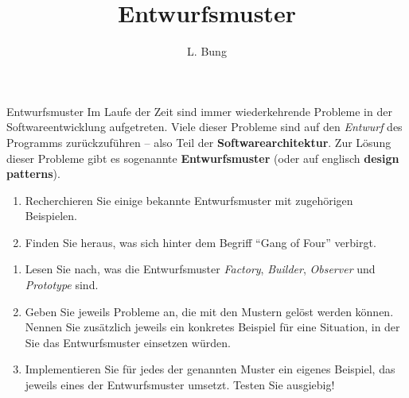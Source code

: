 \documentclass[11pt, a4paper, oneside]{article}
\begin{document}
	\author{L. Bung}
	\title{Entwurfsmuster}
	\subject{SAE}
	\maketitle
	
	\begin{hint}{Entwurfsmuster}
		Im Laufe der Zeit sind immer wiederkehrende Probleme in der Softwareentwicklung aufgetreten.
		Viele dieser Probleme sind auf den \emph{Entwurf} des Programms zurückzuführen -- also Teil der \textbf{Softwarearchitektur}.
		Zur Lösung dieser Probleme gibt es sogenannte \textbf{Entwurfsmuster} (oder auf englisch \textbf{design patterns}).
	\end{hint}
	
	
	\begin{enumerate}[label=\alph*)]
		\item Recherchieren Sie einige bekannte Entwurfsmuster mit zugehörigen Beispielen.
		
		\boxarea[9cm]
		
		\item Finden Sie heraus, was sich hinter dem Begriff ``Gang of Four'' verbirgt.
		
		\lines[4cm]
	\end{enumerate}
	
	
	\begin{enumerate}[label=\alph*)]
		\item Lesen Sie nach, was die Entwurfsmuster \emph{Factory}, \emph{Builder}, \emph{Observer} und \emph{Prototype} sind.
		
		\item Geben Sie jeweils Probleme an, die mit den Mustern gelöst werden können.
		Nennen Sie zusätzlich jeweils ein konkretes Beispiel für eine Situation, in der Sie das Entwurfsmuster einsetzen würden.
		
		\lines[5cm]
		
		\item Implementieren Sie für jedes der genannten Muster ein eigenes Beispiel, das jeweils eines der Entwurfsmuster umsetzt.
		Testen Sie ausgiebig!
	\end{enumerate}
	
	
\end{document}
